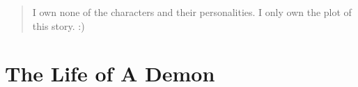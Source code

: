 \documentclass[oneside,10pt]{memoir} %
\begin{document}
\begin{quote}
I own none of the characters and their personalities. I only own the plot of this story. :)
\end{quote}





\chapter{The Life of A Demon}



% 


% 


\end{document}
